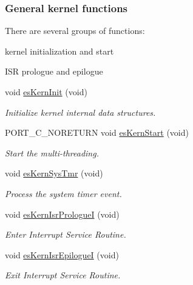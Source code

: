 \subsubsection*{General kernel functions}
\label{_amgrp41382adffec1bac51ecae38edaa569b6}%
There are several groups of functions\-:
\begin{DoxyItemize}
\item kernel initialization and start
\item I\-S\-R prologue and epilogue 
\end{DoxyItemize}\begin{DoxyCompactItemize}
\item 
void \hyperlink{group__kern__intf_ga9e9ff699d62d6035cd51121bb3140704}{es\-Kern\-Init} (void)
\begin{DoxyCompactList}\small\item\em Initialize kernel internal data structures. \end{DoxyCompactList}\item 
P\-O\-R\-T\-\_\-\-C\-\_\-\-N\-O\-R\-E\-T\-U\-R\-N void \hyperlink{group__kern__intf_ga0e7a0a6b9c02df58de0f98de0229a09d}{es\-Kern\-Start} (void)
\begin{DoxyCompactList}\small\item\em Start the multi-\/threading. \end{DoxyCompactList}\item 
void \hyperlink{group__kern__intf_ga3182e4c1a47897109d0a429b10a2483e}{es\-Kern\-Sys\-Tmr} (void)
\begin{DoxyCompactList}\small\item\em Process the system timer event. \end{DoxyCompactList}\item 
void \hyperlink{group__kern__intf_ga194f9cbc5398fe0938504a378fcff810}{es\-Kern\-Isr\-Prologue\-I} (void)
\begin{DoxyCompactList}\small\item\em Enter Interrupt Service Routine. \end{DoxyCompactList}\item 
void \hyperlink{group__kern__intf_ga62d9b43eb8faf6c5df37e7b89811ac8d}{es\-Kern\-Isr\-Epilogue\-I} (void)
\begin{DoxyCompactList}\small\item\em Exit Interrupt Service Routine. \end{DoxyCompactList}\end{DoxyCompactItemize}
